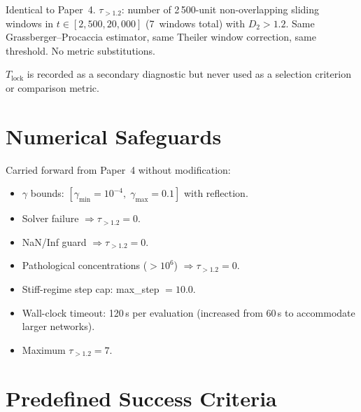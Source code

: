 \documentclass[aps,prl,twocolumn,superscriptaddress,floatfix]{revtex4-2}
\newcommand{\tauexp}{\tau_{>1.2}}
\newcommand{\Tlock}{T_{\mathrm{lock}}}
\newcommand{\Dtwo}{D_2}
\begin{document}
Identical to Paper~4.  $\tauexp$: number of 2\,500-unit
non-overlapping sliding windows in $t \in [2{,}500, 20{,}000]$
(7~windows total) with $\Dtwo > 1.2$.  Same Grassberger--Procaccia
estimator, same Theiler window correction, same threshold.  No
metric substitutions.

$\Tlock$ is recorded as a secondary diagnostic but never used
as a selection criterion or comparison metric.

\section{Numerical Safeguards}

Carried forward from Paper~4 without modification:

\begin{itemize}
  \item $\gamma$ bounds: $[\gamma_{\min} = 10^{-4},\;
    \gamma_{\max} = 0.1]$ with reflection.
  \item Solver failure $\Rightarrow \tauexp = 0$.
  \item NaN/Inf guard $\Rightarrow \tauexp = 0$.
  \item Pathological concentrations ($> 10^6$) $\Rightarrow
    \tauexp = 0$.
  \item Stiff-regime step cap: max\_step $= 10.0$.
  \item Wall-clock timeout: 120\,s per evaluation (increased
    from 60\,s to accommodate larger networks).
  \item Maximum $\tauexp = 7$.
\end{itemize}

\section{Predefined Success Criteria}
\label{sec:success}
\end{document}
